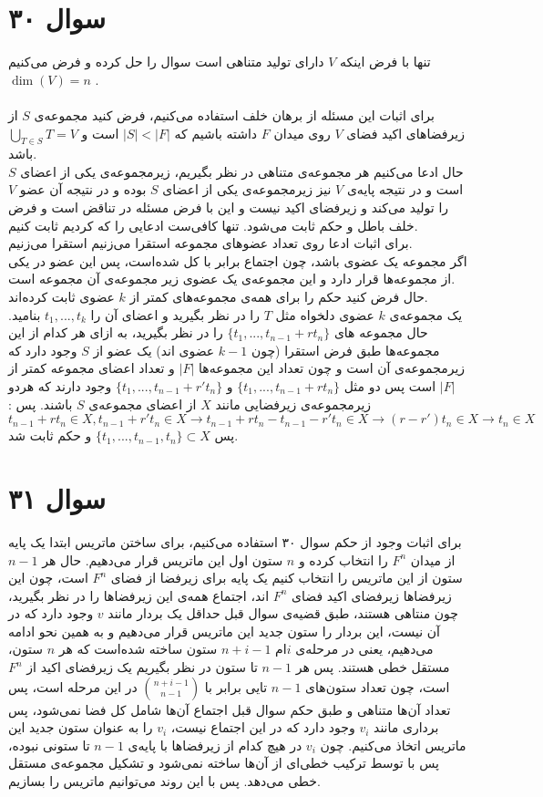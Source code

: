 \documentclass[12pt,a4paper]{article}
\begin{document}
\section{سوال ۳۰}
تنها با فرض اینکه $V$ دارای تولید متناهی است سوال را حل کرده و فرض می‌کنیم 
$\dim(V) = n$
.
\\
\\
برای اثبات این مسئله از برهان خلف استفاده می‌کنیم، فرض کنید مجموعه‌ی $S$ از زیرفضاهای اکید فضای $V$ روی میدان $F$ داشته باشیم که
$|S| < |F|$
است و 
$\bigcup_{T \in S} T = V$
باشد.
\\
حال ادعا می‌کنیم هر مجموعه‌ی متناهی در نظر بگیریم، زیرمجموعه‌ی یکی از اعضای $S$ است و در نتیجه پایه‌ی $V$ نیز زیرمجموعه‌ی یکی از اعضای $S$ بوده و در نتیجه آن عضو $V$ را تولید می‌کند و زیرفضای اکید نیست و این با فرض مسئله در تناقض است و فرض خلف باطل و حکم ثابت می‌شود. تنها کافی‌ست ادعایی را که کردیم ثابت کنیم.
\\
برای اثبات ادعا روی تعداد عضو‌های مجموعه استقرا می‌زنیم استقرا می‌زنیم.
\\
اگر مجموعه یک عضوی باشد، چون اجتماع برابر با کل شده‌است، پس این عضو در یکی از مجموعه‌ها قرار دارد و این مجموعه‌ی یک عضوی زیر مجموعه‌ی آن مجموعه است.
\\
حال فرض کنید حکم را برای همه‌ی مجموعه‌های کمتر از $k$ عضوی ثابت کرده‌اند.
\\
یک مجموعه‌ی $k$ عضوی دلخواه مثل $T$ را در نظر بگیرید و اعضای آن را $t_1, ..., t_k$ بنامید. حال مجموعه‌‌ های 
$\{t_1, ..., t_{n-1} + r t_n\}$
را در نظر بگیرید، به ازای هر کدام از این مجموعه‌ها طبق فرض استقرا (چون $k-1$ عضوی اند) یک عضو از $S$ وجود دارد که زیرمجموعه‌ی آن است و چون تعداد این مجموعه‌ها $|F|$ و تعداد اعضای مجموعه کمتر از $|F|$ است پس دو مثل
$\{t_1, ..., t_{n-1} + r t_n\}$
و
$\{t_1, ..., t_{n-1} + r' t_n\}$
وجود دارند که هردو زیرمجموعه‌ی زیرفضایی مانند $X$ از اعضای مجموعه‌ی $S$ باشند. پس :
$t_{n-1} + r t_n \in X, t_{n-1} + r' t_n \in X \rightarrow t_{n-1} + r t_n - t_{n-1} - r' t_n \in X \rightarrow (r-r')t_n \in X \rightarrow t_n \in X$
پس
$\{t_1, ..., t_{n-1} , t_n\} \subset X$
و حکم ثابت شد.

\section{سوال ۳۱}
برای اثبات وجود از حکم سوال ۳۰ استفاده می‌کنیم، برای ساختن ماتریس ابتدا یک پایه از میدان $F^n$ را انتخاب کرده و $n$ ستون اول این ماتریس قرار می‌دهیم. 
حال هر
$n-1$
ستون از این ماتریس را انتخاب کنیم یک پایه‌ برای زیرفضا از فضای 
$F^n$
است، چون این زیرفضاها زیرفضای اکید فضای 
$F^n$
اند، اجتماع همه‌ی این زیرفضا‌ها را در نظر بگیرید، چون منتاهی هستند، طبق قضیه‌ی سوال قبل حداقل یک بردار مانند 
$v$
وجود دارد که در آن نیست، این بردار را ستون جدید این ماتریس قرار می‌دهیم و به همین نحو ادامه می‌دهیم، یعنی در مرحله‌ی $i$ام 
$n+i-1$
ستون ساخته شده‌است که هر $n$ ستون، مستقل خطی هستند. پس هر $n-1$ تا ستون در نظر بگیریم یک زیرفضای اکید از 
$F^n$
است، چون تعداد ستون‌های $n-1$ تایی برابر با 
$\binom{n+i-1}{n-1}$
در این مرحله است، پس تعداد آن‌ها متناهی و طبق حکم سوال قبل اجتماع آن‌ها شامل کل فضا نمی‌شود، پس برداری مانند $v_i$ وجود دارد که در این اجتماع نیست، $v_i$ را به عنوان ستون جدید این ماتریس اتخاذ می‌کنیم. چون $v_i$ در هیچ کدام از زیرفضا‌ها با پایه‌ی $n-1$ تا ستونی نبوده، پس با توسط ترکیب خطی‌ای از آن‌ها ساخته نمی‌شود و تشکیل مجموعه‌ی مستقل خطی می‌دهد. پس با این روند می‌توانیم ماتریس را بسازیم.
\end{document}
